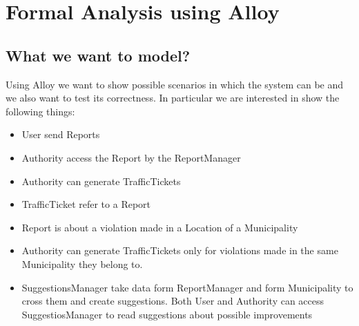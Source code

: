 \section{Formal Analysis using Alloy}
\subsection{What we want to model?}

Using Alloy we want to show possible scenarios in which the system can be and we also want to test its correctness.
In particular we are interested in show the following things:
\begin{itemize}
    \item User send Reports
    \item Authority access the Report by the ReportManager
    \item Authority can generate TrafficTickets
    \item TrafficTicket refer to a Report
    \item Report is about a violation made in a Location of a Municipality
    \item Authority can generate TrafficTickets only for violations made in the same Municipality they belong to.
    \item SuggestionsManager take data form ReportManager and form Municipality to cross them and create suggestions. Both User and Authority can access SuggestiosManager to read suggestions about possible improvements
\end{itemize}

\vspace{20px}

